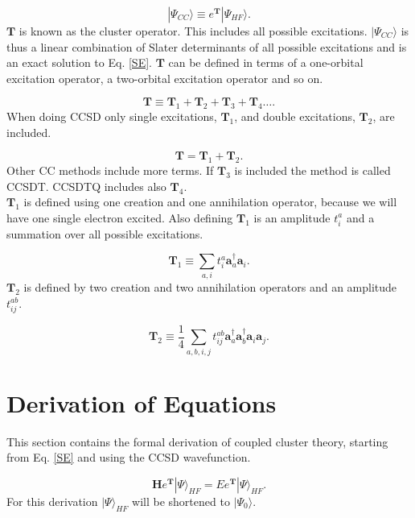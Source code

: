\begin{equation}
|\Psi_{CC} \rangle \equiv e^{\textbf{T}} | \Psi_{HF} \rangle .
\end{equation} 
$\textbf{T}$ is known as the cluster operator. This includes all possible excitations. $|\Psi_{CC} \rangle$ is thus a linear combination of Slater determinants of all possible excitations and is an exact solution to Eq. \eqref{SE}. $\textbf{T}$ can be defined in terms of a one-orbital excitation operator, a two-orbital excitation operator and so on.

\begin{equation}
\textbf{T} \equiv \textbf{T}_1 + \textbf{T}_2 + \textbf{T}_3 + \textbf{T}_4 \dots .
\end{equation}
When doing CCSD only single excitations, $\textbf{T}_1$, and double excitations, $\textbf{T}_2$, are included. 

\begin{equation}
\textbf{T} = \textbf{T}_1 + \textbf{T}_2 .
\end{equation}
Other CC methods include more terms. If $\textbf{T}_3$ is included the method is called CCSDT. CCSDTQ includes also $\textbf{T}_4$. \\

$\textbf{T}_1$ is defined using one creation and one annihilation operator, because we will have one single electron excited. Also defining $\textbf{T}_1$ is an amplitude $t_i^a$ and a summation over all possible excitations.  

\begin{equation}
\textbf{T}_1 \equiv \sum_{a,i} t_i^a \textbf{a}^{\dag}_a \textbf{a}_i . \label{t1defi}
\end{equation}
$\textbf{T}_2$ is defined by two creation and two annihilation operators and an amplitude $t_{ij}^{ab}$.

\begin{equation}
\textbf{T}_2 \equiv \frac{1}{4} \sum_{a,b,i,j} t_{ij}^{ab} \textbf{a}^{\dag}_a \textbf{a}^{\dag}_b \textbf{a}_i \textbf{a}_j . \label{t2defi}
\end{equation}

\section{Derivation of Equations}
This section contains the formal derivation of coupled cluster theory, starting from Eq. \eqref{SE} and using the CCSD wavefunction. 

\begin{equation}
\textbf{H} e^{\textbf{T}} |\Psi \rangle_{HF} = E e^{\textbf{T}} |\Psi \rangle_{HF} .
\end{equation}
For this derivation $|\Psi \rangle_{HF}$ will be shortened to $|\Psi_0 \rangle$. 

